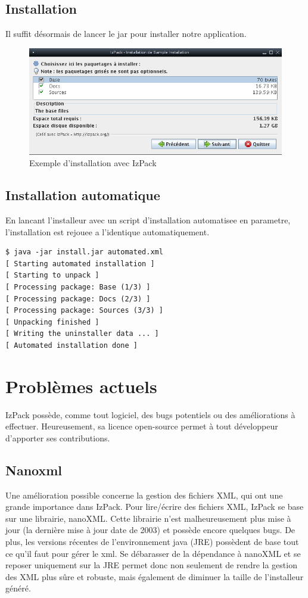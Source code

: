 \subsection{Installation}
Il suffit désormais de lancer le jar pour installer notre application.
\begin{figure}[H]
	\centering
	\includegraphics[width=15cm]{../image/installSample.png}
	\caption{Exemple d'installation avec IzPack}
\end{figure}

\subsection{Installation automatique}
En lancant l'installeur avec un script d'installation automatisee en parametre, l'installation est rejouee a l'identique automatiquement.
\begin{verbatim}
$ java -jar install.jar automated.xml
[ Starting automated installation ]
[ Starting to unpack ]
[ Processing package: Base (1/3) ]
[ Processing package: Docs (2/3) ]
[ Processing package: Sources (3/3) ]
[ Unpacking finished ]
[ Writing the uninstaller data ... ]
[ Automated installation done ]
\end{verbatim}


\section{Problèmes actuels}
IzPack possède, comme tout logiciel, des bugs potentiels ou des améliorations à effectuer.
Heureusement, sa licence open-source permet à tout développeur d'apporter ses contributions.

\subsection{Nanoxml}
Une amélioration possible concerne la gestion des fichiers XML, qui ont une grande importance dans IzPack.
Pour lire/écrire des fichiers XML, IzPack se base sur une librairie, nanoXML. Cette librairie n'est malheureusement plus mise à jour (la dernière mise à jour date de 2003) et possède encore quelques bugs.
De plus, les versions récentes de l'environnement java (JRE) possèdent de base tout ce qu'il faut pour gérer le xml.
Se débarasser de la dépendance à nanoXML et se reposer uniquement sur la JRE permet donc non seulement de rendre la gestion des XML plus sûre et robuste, mais également de diminuer la taille de l'installeur généré.
